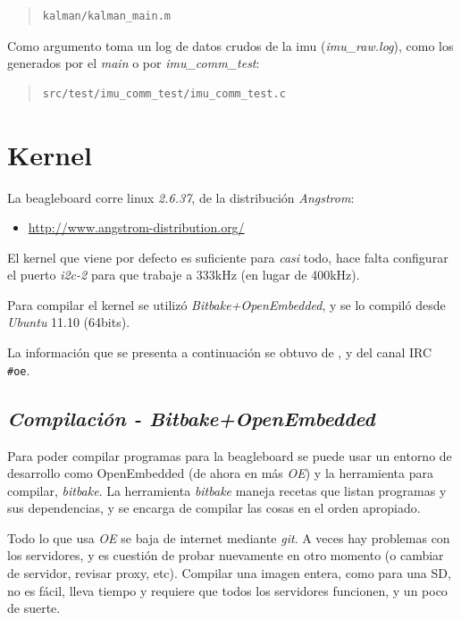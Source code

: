 \documentclass[main]{subfiles}
\begin{document}
\begin{quote}
\begin{verbatim}
kalman/kalman_main.m
\end{verbatim}
\end{quote}

Como argumento toma un log de datos crudos de la imu (\textit{imu\_raw.log}), como los generados por el \textit{main} o por \textit{imu\_comm\_test}:
\begin{quote}
\begin{verbatim}
src/test/imu_comm_test/imu_comm_test.c
\end{verbatim}
\end{quote}

\section{Kernel}
\label{sec:codigo:kernel}

La beagleboard corre linux \textit{2.6.37}, de la distribución \textit{Angstrom}:
\begin{itemize}
\item \url{http://www.angstrom-distribution.org/}
\end{itemize}
El kernel que viene por defecto es suficiente para \textit{casi} todo, hace falta configurar el puerto \textit{i2c-2} para que trabaje a 333kHz (en lugar de 400kHz).

Para compilar el kernel se utilizó \textit{Bitbake+OpenEmbedded}, y se lo compiló desde \textit{Ubuntu} 11.10 (64bits).

La información que se presenta a continuación se obtuvo de \cite{bib:oe-capture-changes}, \cite{bib:oe-angstrom-kernel-workflow} y del canal IRC \verb+#oe+.

\subsection{\textit{Compilación - Bitbake+OpenEmbedded}}
\label{sec:codigo:cross-compiling-bitbake-oe}

Para poder compilar programas para la beagleboard se puede usar un entorno de desarrollo como OpenEmbedded (de ahora en más \textit{OE}) y la herramienta para compilar, \textit{bitbake}. La herramienta \textit{bitbake} maneja recetas que listan programas y sus dependencias, y se encarga de compilar las cosas en el orden apropiado.

Todo lo que usa \textit{OE} se baja de internet mediante \textit{git}. A veces hay problemas con los servidores, y es cuestión de probar nuevamente en otro momento (o cambiar de servidor, revisar proxy, etc). Compilar una imagen entera, como para una SD, no es fácil, lleva tiempo y requiere que todos los servidores funcionen, y un poco de suerte.
\end{document}
